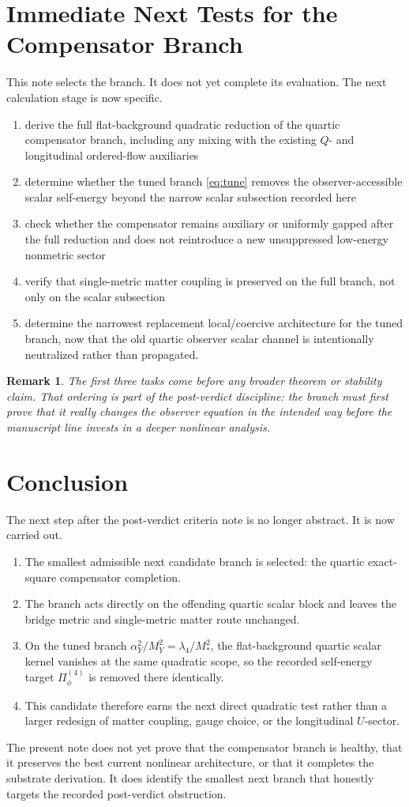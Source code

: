 \documentclass[11pt]{article}
\newtheorem{remark}{Remark}
\begin{document}
\section{Immediate Next Tests for the Compensator Branch}

This note selects the branch. It does not yet complete its evaluation. The next calculation stage is now specific.

\begin{enumerate}
    \item derive the full flat-background quadratic reduction of the quartic compensator branch, including any mixing with the existing \(Q\)- and longitudinal ordered-flow auxiliaries
    \item determine whether the tuned branch \eqref{eq:tune} removes the observer-accessible scalar self-energy beyond the narrow scalar subsection recorded here
    \item check whether the compensator remains auxiliary or uniformly gapped after the full reduction and does not reintroduce a new unsuppressed low-energy nonmetric sector
    \item verify that single-metric matter coupling is preserved on the full branch, not only on the scalar subsection
    \item determine the narrowest replacement local/coercive architecture for the tuned branch, now that the old quartic observer scalar channel is intentionally neutralized rather than propagated.
\end{enumerate}

\begin{remark}
The first three tasks come before any broader theorem or stability claim. That ordering is part of the post-verdict discipline: the branch must first prove that it really changes the observer equation in the intended way before the manuscript line invests in a deeper nonlinear analysis.
\end{remark}

\section{Conclusion}

The next step after the post-verdict criteria note is no longer abstract. It is now carried out.
\begin{enumerate}
    \item The smallest admissible next candidate branch is selected: the quartic exact-square compensator completion.
    \item The branch acts directly on the offending quartic scalar block and leaves the bridge metric and single-metric matter route unchanged.
    \item On the tuned branch \(\alpha_Y^2/M_Y^2=\lambda_4/M_*^2\), the flat-background quartic scalar kernel vanishes at the same quadratic scope, so the recorded self-energy target \(\Pi_\phi^{(4)}\) is removed there identically.
    \item This candidate therefore earns the next direct quadratic test rather than a larger redesign of matter coupling, gauge choice, or the longitudinal \(U\)-sector.
\end{enumerate}

The present note does not yet prove that the compensator branch is healthy, that it preserves the best current nonlinear architecture, or that it completes the substrate derivation. It does identify the smallest next branch that honestly targets the recorded post-verdict obstruction.
\end{document}
